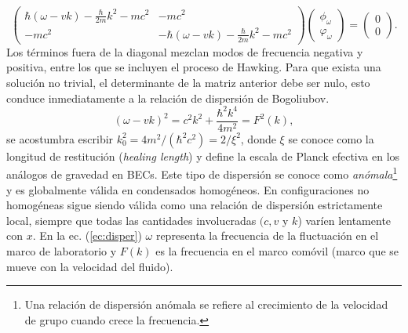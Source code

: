 \begin{equation}
\begin{pmatrix}
\hbar(\omega-v k)-\displaystyle \frac{\hbar}{2m}k^2-mc^2 &-mc^2\\
-mc^2&-\hbar(\omega-vk)-\displaystyle \frac{\hbar}{2m}k^2-mc^2
\end{pmatrix}\begin{pmatrix}
\phi_{\omega}\\
\varphi_{\omega}
\end{pmatrix}=\begin{pmatrix}
0\\
0  
\end{pmatrix}.
\end{equation}
Los t\'{e}rminos fuera de la diagonal mezclan modos de frecuencia negativa y positiva, entre los que se incluyen el proceso de Hawking. Para que exista una solución no trivial, el determinante de la matriz anterior debe ser nulo, esto conduce inmediatamente a la relación de dispersión de Bogoliubov.
\begin{equation}\label{ec:disper}
(\omega-v k)^2=c^2 k^2+\frac{\hbar^2k^4}{4m^2}=F^2(k),
\end{equation}
se acostumbra escribir $k^2_0=4m^2/(\hbar^2c^2)=2/\xi^2$, donde $\xi$ se conoce como la longitud de restituci\'{o}n (\textit{healing length}) y define la escala de Planck efectiva en los an\'{a}logos de gravedad en BECs. Este tipo de dispersi\'{o}n se conoce como \textit{an\'{o}mala}\footnote{Una relaci\'{o}n de dispersi\'{o}n an\'{o}mala se refiere al crecimiento de la velocidad de grupo cuando crece la frecuencia.} y es globalmente válida en condensados homogéneos. En configuraciones no homogéneas sigue siendo válida como una relación de dispersión estrictamente local, siempre que todas las cantidades involucradas $(c, v$ y $k$) varíen lentamente con $x$. En la ec. (\ref{ec:disper}) $\omega$ representa la frecuencia de la fluctuaci\'{o}n en el marco de laboratorio y $F(k)$ es la frecuencia en el marco com\'{o}vil (marco que se mueve con la velocidad del fluido).\\


